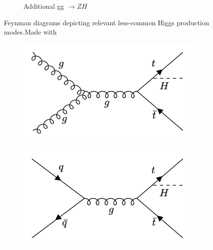 \begin{figure}[htp]
\begin{subfigure}[b]{0.3\textwidth}
         \caption{Additional gg $\rightarrow ZH$ }
         \label{fig:ggZH}
     \end{subfigure}
     \hfill
  \label{fig:loopmodes}
  \caption{Feynman diagrams depicting relevant less-common Higgs production modes.Made with \cite{FeynmanMaker}}  
\end{figure}

\begin{figure}[htp]
  \centering
       \begin{subfigure}[b]{0.3\textwidth}
         \centering
         \includegraphics[width=\textwidth]{figures/theory_chapter/ttH1.png}
         \label{fig:ttH1}
     \end{subfigure}
     \hfill
       \begin{subfigure}[b]{0.3\textwidth}
         \centering
         \includegraphics[width=\textwidth]{figures/theory_chapter/ttH2.png}
         \label{fig:ttH2}
     \end{subfigure}
     \hfill
       \begin{subfigure}[b]{0.3\textwidth}
         \centering

\end{subfigure}
\end{figure}
